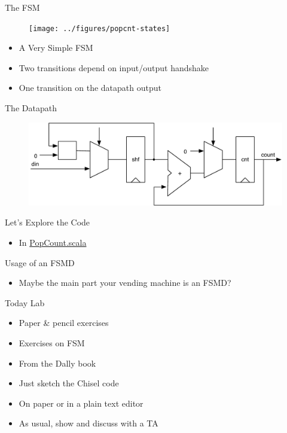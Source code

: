 \begin{frame}[fragile]{The FSM}
\begin{figure}
  \texttt{[image: ../figures/popcnt-states]}
\end{figure}
\begin{itemize}
\item A Very Simple FSM
\item Two transitions depend on input/output handshake
\item One transition on the datapath output
\end{itemize}
\end{frame}

\begin{frame}[fragile]{The Datapath}
\begin{figure}
  \includegraphics[scale=0.65]{../figures/popcnt-data}
\end{figure}
\end{frame}

\begin{frame}[fragile]{Let's Explore the Code}
\begin{itemize}
\item In \href{https://github.com/schoeberl/chisel-book/blob/master/src/main/scala/PopCount.scala}{PopCount.scala}
\end{itemize}
\end{frame}

\begin{frame}[fragile]{Usage of an FSMD}
\begin{itemize}
\item Maybe the main part your vending machine is an FSMD?
\end{itemize}
\end{frame}




\begin{frame}[fragile]{Today Lab}
\begin{itemize}
\item Paper \& pencil exercises
\item Exercises on FSM
\item From the Dally book
\item Just sketch the Chisel code
\item On paper or in a plain text editor
\item As usual, show and discuss with a TA
\end{itemize}
\end{frame}

